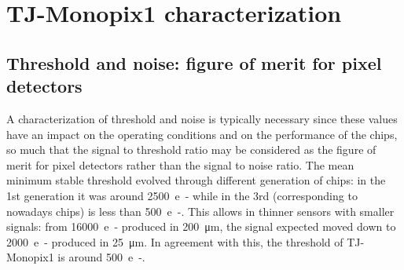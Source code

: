 
\section{TJ-Monopix1 characterization}
    \subsection{Threshold and noise: figure of merit for pixel detectors}
        A characterization of threshold and noise is typically necessary since these values have an impact on the operating conditions and on the performance of the chips, so much that the signal to threshold ratio may be considered as the figure of merit for pixel detectors rather than the signal to noise ratio.
        The mean minimum stable threshold evolved through different generation of chips: in the 1st generation it was around \SI{2500}{e-} while in the 3rd (corresponding to nowadays chips) is less than \SI{500}{e-}. This allows in thinner sensors with smaller signals: from \SI{16000}{e-} produced in \SI{200}{\um}, the signal expected moved down to \SI{2000}{e-} produced in \SI{25}{\um}. In agreement with this, the threshold of TJ-Monopix1 is around \SI{500}{e-}.
 
